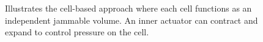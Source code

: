 \begin{figure}
\begin{minipage}[t]{.44\textwidth}
    \caption[The cell-based jamming approach.]
    {Illustrates the cell-based approach where each cell functions as an independent jammable volume. An inner actuator can contract and expand to control pressure on the cell.}
    \label{fig:ch:jamming:approaches:cell}
  \end{minipage}%
\end{figure}

